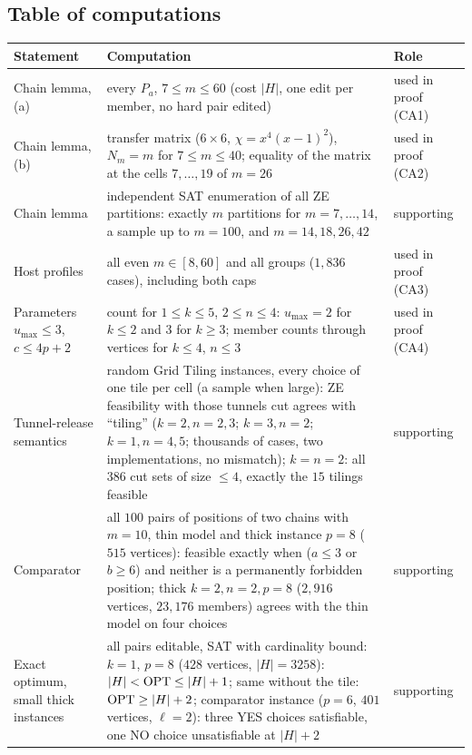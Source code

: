 \subsection{Table of computations}
{\small
\begin{longtable}{@{}>{\raggedright\arraybackslash}p{}>{\raggedright\arraybackslash}p{}>{\raggedright\arraybackslash}p{}@{}}
\hline
Statement & Computation & Role\\\hline\endhead
Chain lemma, (a) & every $P_a$, $7\le m\le60$ (cost $|H|$, one edit per member, no hard pair edited) & used in proof (CA1)\\
Chain lemma, (b) & transfer matrix ($6\times6$, $\chi=x^4(x-1)^2$), $N_m=m$ for $7\le m\le40$; equality of the matrix at the cells $7,\dots,19$ of $m=26$ & used in proof (CA2)\\
Chain lemma & independent SAT enumeration of all ZE partitions: exactly $m$ partitions for $m=7,\dots,14$, a sample up to $m=100$, and $m=14,18,26,42$ & supporting\\
Host profiles & all even $m\in[8,60]$ and all groups ($1{,}836$ cases), including both caps & used in proof (CA3)\\
Parameters $u_{\max}\le3$, $c\le4p+2$ & count for $1\le k\le5$, $2\le n\le4$: $u_{\max}=2$ for $k\le2$ and $3$ for $k\ge3$; member counts through vertices for $k\le4$, $n\le3$ & used in proof (CA4)\\
Tunnel-release semantics & random Grid Tiling instances, every choice of one tile per cell (a sample when large): ZE feasibility with those tunnels cut agrees with ``tiling'' ($k=2,n=2,3$; $k=3,n=2$; $k=1,n=4,5$; thousands of cases, two implementations, no mismatch); $k=n=2$: all $386$ cut sets of size $\le4$, exactly the $15$ tilings feasible & supporting\\
Comparator & all $100$ pairs of positions of two chains with $m=10$, thin model and thick instance $p=8$ ($515$ vertices): feasible exactly when ($a\le3$ or $b\ge6$) and neither is a permanently forbidden position; thick $k=2,n=2,p=8$ ($2{,}916$ vertices, $23{,}176$ members) agrees with the thin model on four choices & supporting\\
Exact optimum, small thick instances & all pairs editable, SAT with cardinality bound: $k=1$, $p=8$ ($428$ vertices, $|H|=3258$): $|H|<\mathrm{OPT}\le|H|+1$; same without the tile: $\mathrm{OPT}\ge|H|+2$; comparator instance ($p=6$, $401$ vertices, $\ell=2$): three YES choices satisfiable, one NO choice unsatisfiable at $|H|+2$ & supporting\\

\end{longtable}}
